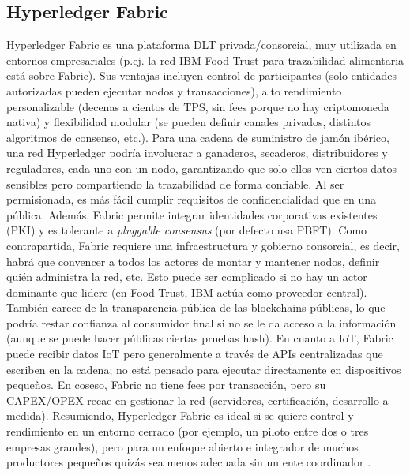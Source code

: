 \subsection{Hyperledger Fabric}\label{sec:estado-fabric}
Hyperledger Fabric es una plataforma DLT privada/consorcial, muy utilizada en entornos empresariales (p.ej. la red IBM Food Trust para trazabilidad alimentaria está sobre Fabric). Sus ventajas incluyen control de participantes (solo entidades autorizadas pueden ejecutar nodos y transacciones), alto rendimiento personalizable (decenas a cientos de TPS, sin fees porque no hay criptomoneda nativa) y flexibilidad modular (se pueden definir canales privados, distintos algoritmos de consenso, etc.). Para una cadena de suministro de jamón ibérico, una red Hyperledger podría involucrar a ganaderos, secaderos, distribuidores y reguladores, cada uno con un nodo, garantizando que solo ellos ven ciertos datos sensibles pero compartiendo la trazabilidad de forma confiable. Al ser permisionada, es más fácil cumplir requisitos de confidencialidad que en una pública. Además, Fabric permite integrar identidades corporativas existentes (PKI) y es tolerante a \textit{pluggable consensus} (por defecto usa PBFT). Como contrapartida, Fabric requiere una infraestructura y gobierno consorcial, es decir, habrá que convencer a todos los actores de montar y mantener nodos, definir quién administra la red, etc. Esto puede ser complicado si no hay un actor dominante que lidere (en Food Trust, IBM actúa como proveedor central). También carece de la transparencia pública de las blockchains públicas, lo que podría restar confianza al consumidor final si no se le da acceso a la información (aunque se puede hacer públicas ciertas pruebas hash). En cuanto a IoT, Fabric puede recibir datos IoT pero generalmente a través de APIs centralizadas que escriben en la cadena; no está pensado para ejecutar directamente en dispositivos pequeños. En coseso, Fabric no tiene fees por transacción, pero su CAPEX/OPEX recae en gestionar la red (servidores, certificación, desarrollo a medida). Resumiendo, Hyperledger Fabric es ideal si se quiere control y rendimiento en un entorno cerrado (por ejemplo, un piloto entre dos o tres empresas grandes), pero para un enfoque abierto e integrador de muchos productores pequeños quizás sea menos adecuada sin un ente coordinador \cite{noauthor_blockchain_nodate-2}.

